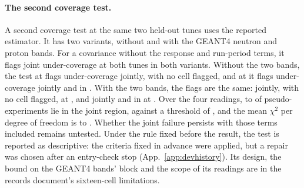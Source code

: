 \paragraph{The second coverage test.} A second coverage test at the same two held-out tunes uses the reported estimator. It has two variants, without and with the GEANT4 neutron and proton bands. For a covariance without the response and run-period terms, it flags joint under-coverage at both tunes in both variants. Without the two bands, the test at  flags under-coverage jointly, with no cell flagged, and at  it flags under-coverage jointly and in . With the two bands, the flags are the same: jointly, with no cell flagged, at , and jointly and in  at . Over the four readings,  to  of  pseudo-experiments lie in the joint region, against a threshold of , and the mean $\chi^2$ per degree of freedom is  to . Whether the joint failure persists with those terms included remains untested. Under the rule fixed before the result, the test is reported as descriptive: the criteria fixed in advance were applied, but a repair was chosen after an entry-check stop (App.~\ref{app:devhistory}). Its design, the bound on the GEANT4 bands' block and the scope of its readings are in the records document's sixteen-cell limitations.

